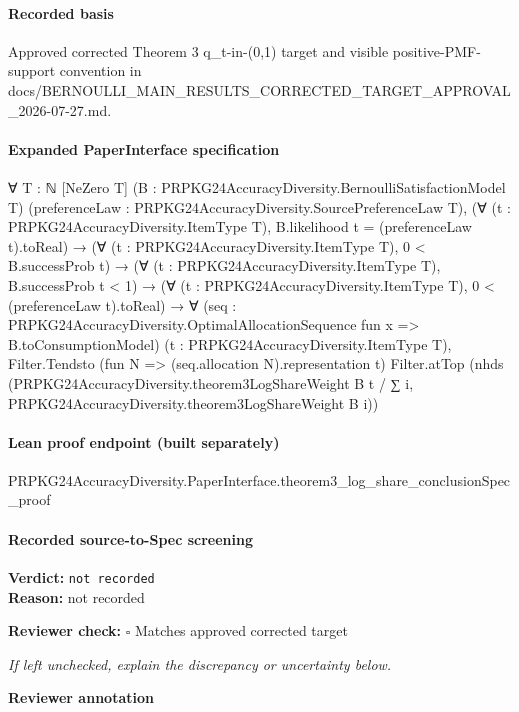 \documentclass[10pt]{article}
\newcommand{\reviewerbox}{%
  \par\noindent\fbox{\parbox{0.96\linewidth}{\rule{0pt}{0.38in}}}\par
}
\newcommand{\reviewmatch}[1]{%
  \par\noindent\textbf{Reviewer check:} $\square$\; #1\par
  \noindent\emph{If left unchecked, explain the discrepancy or uncertainty below.}\par
}
\begin{document}
\paragraph{Recorded basis}
Approved corrected Theorem 3 q\_\allowbreak{}t-\allowbreak{}in-\allowbreak{}(0,1) target and visible positive-\allowbreak{}PMF-\allowbreak{}support convention in docs/\allowbreak{}BERNOULLI\_\allowbreak{}MAIN\_\allowbreak{}RESULTS\_\allowbreak{}CORRECTED\_\allowbreak{}TARGET\_\allowbreak{}APPROVAL\_\allowbreak{}2026-\allowbreak{}07-\allowbreak{}27.\allowbreak{}md.\allowbreak{}
\paragraph{Expanded PaperInterface specification}
\begin{ReviewVerbatim}
∀ {T : ℕ} [NeZero T] (B : PRPKG24AccuracyDiversity.BernoulliSatisfactionModel T)
  (preferenceLaw : PRPKG24AccuracyDiversity.SourcePreferenceLaw T),
  (∀ (t : PRPKG24AccuracyDiversity.ItemType T), B.likelihood t = (preferenceLaw t).toReal) →
    (∀ (t : PRPKG24AccuracyDiversity.ItemType T), 0 < B.successProb t) →
      (∀ (t : PRPKG24AccuracyDiversity.ItemType T), B.successProb t < 1) →
        (∀ (t : PRPKG24AccuracyDiversity.ItemType T), 0 < (preferenceLaw t).toReal) →
          ∀ (seq : PRPKG24AccuracyDiversity.OptimalAllocationSequence fun x => B.toConsumptionModel)
            (t : PRPKG24AccuracyDiversity.ItemType T),
            Filter.Tendsto (fun N => (seq.allocation N).representation t) Filter.atTop
              (nhds
                (PRPKG24AccuracyDiversity.theorem3LogShareWeight B t /
                  ∑ i, PRPKG24AccuracyDiversity.theorem3LogShareWeight B i))
\end{ReviewVerbatim}

\paragraph{Lean proof endpoint (built separately)}\begin{ReviewVerbatim}
PRPKG24AccuracyDiversity.PaperInterface.theorem3_log_share_conclusionSpec_proof
\end{ReviewVerbatim}

\paragraph{Recorded source-to-Spec screening}
\textbf{Verdict:} \texttt{not recorded}
\\
\textbf{Reason:} not recorded
\reviewmatch{Matches approved corrected target}
\noindent\textbf{Reviewer annotation}\par
\reviewerbox
\clearpage
\hypertarget{source-claim-a9a6608e74ff7dd3}{}
\end{document}

